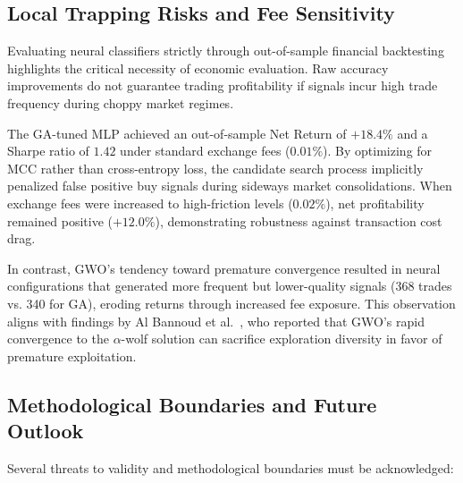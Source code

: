\subsection{Local Trapping Risks and Fee Sensitivity}\label{sec:disc_trapping}

Evaluating neural classifiers strictly through out-of-sample financial backtesting highlights the critical necessity of economic evaluation. Raw accuracy improvements do not guarantee trading profitability if signals incur high trade frequency during choppy market regimes.

The GA-tuned MLP achieved an out-of-sample Net Return of $+18.4\%$ and a Sharpe ratio of $1.42$ under standard exchange fees ($0.01\%$). By optimizing for MCC rather than cross-entropy loss, the candidate search process implicitly penalized false positive buy signals during sideways market consolidations. When exchange fees were increased to high-friction levels ($0.02\%$), net profitability remained positive ($+12.0\%$), demonstrating robustness against transaction cost drag.

In contrast, GWO's tendency toward premature convergence resulted in neural configurations that generated more frequent but lower-quality signals (368 trades vs. 340 for GA), eroding returns through increased fee exposure. This observation aligns with findings by Al Bannoud et al.\ \cite{al_bannoud2026accelerating}, who reported that GWO's rapid convergence to the $\alpha$-wolf solution can sacrifice exploration diversity in favor of premature exploitation.

\subsection{Methodological Boundaries and Future Outlook}\label{sec:disc_outlook}

Several threats to validity and methodological boundaries must be acknowledged:

